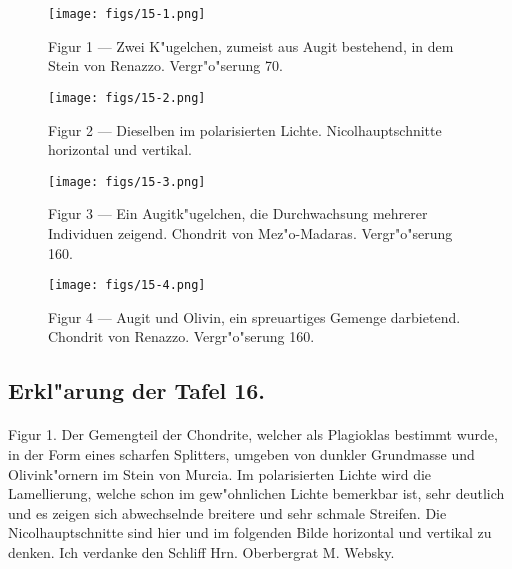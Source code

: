 \documentclass[a4paper, 11pt, oneside, polutonikogreek, german]{article}
\begin{document}
\vspace*{\fill}
\begin{figure}[H]
\centering
\texttt{[image: figs/15-1.png]}
\caption{\small Figur 1 --- Zwei K"ugelchen, zumeist aus Augit bestehend, in dem Stein von Renazzo. Vergr"o"serung 70.}
\end{figure}
\vspace*{\fill}
\clearpage

\vspace*{\fill}
\begin{figure}[H]
\centering
\texttt{[image: figs/15-2.png]}
\caption{\small Figur 2 --- Dieselben im polarisierten Lichte. Nicolhauptschnitte horizontal und vertikal.}
\end{figure}
\vspace*{\fill}
\clearpage

\vspace*{\fill}
\begin{figure}[H]
\centering
\texttt{[image: figs/15-3.png]}
\caption{\small Figur 3 --- Ein Augitk"ugelchen, die Durchwachsung mehrerer Individuen zeigend. Chondrit von Mez"o-Madaras. Vergr"o"serung 160.}
\end{figure}
\vspace*{\fill}
\clearpage

\vspace*{\fill}
\begin{figure}[H]
\centering
\texttt{[image: figs/15-4.png]}
\caption{\small Figur 4 --- Augit und Olivin, ein spreuartiges Gemenge darbietend. Chondrit von Renazzo. Vergr"o"serung 160.}
\end{figure}
\vspace*{\fill}
\clearpage

\subsection{Erkl"arung der Tafel 16.}
\paragraph{}
Figur 1. Der Gemengteil der Chondrite, welcher als Plagioklas bestimmt wurde, in der Form eines scharfen Splitters, umgeben von dunkler Grundmasse und Olivink"ornern im Stein von Murcia. Im polarisierten Lichte wird die Lamellierung, welche schon im gew"ohnlichen Lichte bemerkbar ist, sehr deutlich und es zeigen sich abwechselnde breitere und sehr schmale Streifen. Die Nicolhauptschnitte sind hier und im folgenden Bilde horizontal und vertikal zu denken. Ich verdanke den Schliff Hrn. Oberbergrat M. Websky.
\end{document}

